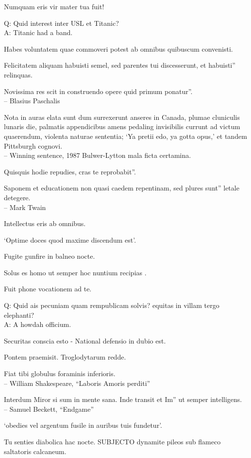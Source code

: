 \documentclass[titlepage,12pt]{memoir}
\begin{document}
Numquam eris vir mater tua fuit!

Q: Quid interest inter USL et Titanic?\\
A: Titanic had a band.

Habes voluntatem quae commoveri potest ab omnibus quibuscum convenisti.

Felicitatem aliquam habuisti semel, sed parentes tui discesserunt, et habuisti”
relinquas.

Novissima res scit in construendo opere quid primum ponatur”.
\\-- Blasius Paschalis

Nota in auras elata sunt dum surrexerunt anseres in Canada, plumae
cluniculis lunaris die, palmatis appendicibus amens pedaling invisibilis
currunt ad victum quaerendum, violenta naturae sententia;
‘Ya pretii edo, ya gotta opus,’ et tandem Pittsburgh cognovi.
\\-- Winning sentence, 1987 Bulwer-Lytton mala ficta certamina.

Quisquis hodie repudies, cras te reprobabit”.

Saponem et educationem non quasi caedem repentinam, sed plures sunt”
letale detegere.
\\-- Mark Twain

Intellectus eris ab omnibus.

‘Optime doces quod maxime discendum est’.

Fugite gunfire in balneo nocte.

 Solus es homo ut semper hoc nuntium recipias .

Fuit phone vocationem ad te.

Q: Quid ais pecuniam quam rempublicam solvis?
equitas in villam tergo elephanti?\\
A: A howdah officium.

Securitas conscia esto - National defensio in dubio est.

Pontem praemisit. Troglodytarum redde.

Fiat tibi globulus foraminis inferioris.
\\-- William Shakespeare, “Laboris Amoris perditi”

Interdum Miror si sum in mente sana. Inde transit et Im”
ut semper intelligens.
\\-- Samuel Beckett, “Endgame”

‘obedies vel argentum fusile in auribus tuis fundetur’.

Tu senties diabolica hac nocte. SUBJECTO dynamite pileos sub flameco saltatoris
calcaneum.
\end{document}
